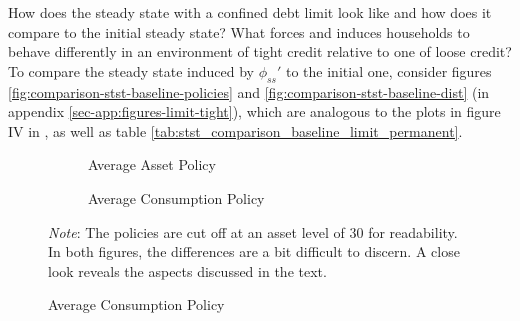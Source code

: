 \documentclass[12pt]{article} %
\numberwithin{equation}{section} %
\numberwithin{figure}{section}
\numberwithin{table}{section}
\begin{document}
How does the steady state with a confined debt limit look like and how does it compare to the initial steady state? What forces and induces households to behave differently in an environment of tight credit relative to one of loose credit? To compare the steady state induced by $\phi_{ss}'$ to the initial one, consider figures \ref{fig:comparison-stst-baseline-policies} and \ref{fig:comparison-stst-baseline-dist} (in appendix \ref{sec-app:figures-limit-tight}), which are analogous to the plots in figure IV in \textcite[p.1443]{gl2017}, as well as table \ref{tab:stst_comparison_baseline_limit_permanent}. 

\begin{figure}[t]
    \caption{Baseline Model -- Shock to the Borrowing Limit: Household Policies}
    \label{fig:comparison-stst-baseline-policies}
    \centering
    \begin{subfigure}[b]{0.49\textwidth}
    \caption{Average Asset Policy}
    \label{fig:comparison-stst-baseline-policies-a}
         \centering
         
     \vspace{0.01cm}
     \end{subfigure}
     \hfill
     \begin{subfigure}[b]{0.49\textwidth}
     \caption{Average Consumption Policy}
     \label{fig:comparison-stst-baseline-policies-c}
         \centering
         
    \vspace{0.01cm}
     \end{subfigure}
     \justifying
     \footnotesize
	\textit{Note}: The policies are cut off at an asset level of $30$ for readability. In both figures, the differences are a bit difficult to discern. A close look reveals the aspects discussed in the text.
\end{figure}
\end{document}

